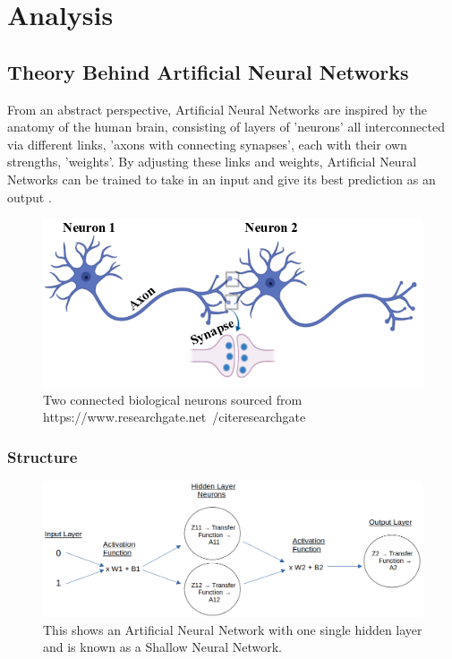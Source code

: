 \documentclass[./project-report/src/latex/project-report.tex]{subfiles}
\begin{document}
\maketitle

\clearpage
\section{Analysis}

\subsection{Theory Behind Artificial Neural Networks}
\label{sec:ann-theory}

From an abstract perspective, Artificial Neural Networks are inspired by the anatomy of the human brain, consisting of layers of 'neurons' all interconnected via 
different links, 'axons with connecting synapses', each with their own strengths, 'weights'. By adjusting these links and weights, Artificial Neural Networks can be trained 
to take in an input and give its best prediction as an output \cite{IBMweb}.

\begin{figure}[h!]
\centering
\includegraphics[width=1\textwidth]{./project-report/src/images/connected-neurons.png}
\caption{Two connected biological neurons sourced from https://www.researchgate.net~/cite{researchgate}}
\end{figure}

\vspace{5mm}

\subsubsection{Structure}

\begin{figure}[h!]
\centering
\includegraphics[width=1\textwidth]{./project-report/src/images/shallow-ann-diagram.png}
\caption{This shows an Artificial Neural Network with one single hidden layer and is known as a Shallow Neural Network.}
\end{figure}
\end{document}
